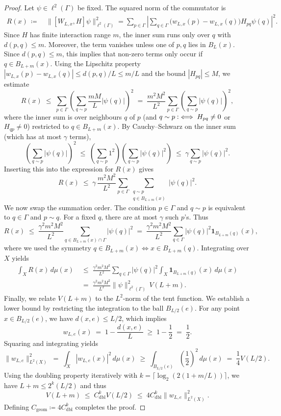 \documentclass[11pt]{article}
\theoremstyle{definition}
\begin{document}
\begin{proof}
Let $\psi \in \ell^2(\Gamma)$ be fixed. The squared norm of the commutator is
\begin{align*}
  R(x)
  \,\coloneqq &\ \bigl\|[W_{L,x}, H] \psi\bigr\|_{\ell^2(\Gamma)}^2
       =  \sum_{p \in \Gamma} \left| \sum_{q \in \Gamma}
        \bigl(w_{L,x}(p) - w_{L,x}(q)\bigr) H_{pq} \psi(q)\right|^2.
\end{align*}
Since $H$ has finite interaction range $m$, the inner sum runs only over $q$ with $d(p,q) \le m$. Moreover, the term vanishes unless one of $p,q$ lies in $B_L(x)$. Since $d(p,q)\le m$, this implies that non-zero terms only occur if $q \in B_{L+m}(x)$.
Using the Lipschitz property $|w_{L,x}(p)-w_{L,x}(q)| \le d(p,q)/L \le m/L$ and the bound $|H_{pq}|\le M$, we estimate
\[
  R(x) \;\le\; \sum_{p \in \Gamma} \left( \sum_{q \sim p} \frac{mM}{L} |\psi(q)| \right)^2 \;=\; \frac{m^2M^2}{L^2}\sum_{p \in \Gamma} \left( \sum_{q \sim p} |\psi(q)| \right)^2,
\]
where the inner sum is over neighbours $q$ of $p$ (and $q\sim p \vcentcolon\iff H_{pq}\ne 0$ or $H_{qp}\ne 0$) restricted to $q \in B_{L+m}(x)$.
By Cauchy--Schwarz on the inner sum (which has at most $\gamma$ terms),
\[
  \left( \sum_{q \sim p} |\psi(q)| \right)^2
  \;\le\;
  \left(\sum_{q \sim p} 1^2\right) \left(\sum_{q \sim p} |\psi(q)|^2\right)
  \;\le\;
  \gamma \sum_{q \sim p} |\psi(q)|^2.
\]
Inserting this into the expression for $R(x)$ gives
\[
  R(x)
  \;\le\; \gamma\, \frac{m^2 M^2}{L^2} \sum_{p \in \Gamma} \sum_{\substack{q \sim p \\ q \in B_{L+m}(x)}} |\psi(q)|^2.
\]
We now swap the summation order. The condition $p \in \Gamma$ and $q \sim p$ is equivalent to $q \in \Gamma$ and $p \sim q$. For a fixed $q$, there are at most $\gamma$ such $p$'s. Thus
\[
  R(x)
  \;\le\; \frac{\gamma^2 m^2 M^2}{L^2} \sum_{q \in B_{L+m}(x)\cap \Gamma} |\psi(q)|^2
  \;=\; \frac{\gamma^2 m^2 M^2}{L^2} \sum_{q \in \Gamma} |\psi(q)|^2 \mathbf{1}_{B_{L+m}(q)}(x),
\]
where we used the symmetry $q \in B_{L+m}(x) \iff x \in B_{L+m}(q)$.
Integrating over $X$ yields
\begin{align*}
  \int_X R(x)\,d\mu(x)
  &\;\le\; \frac{\gamma^2 m^2 M^2}{L^2} \sum_{q \in \Gamma} |\psi(q)|^2 \int_X \mathbf{1}_{B_{L+m}(q)}(x)\,d\mu(x) \\
  &\;=\; \frac{\gamma^2 m^2 M^2}{L^2} \|\psi\|_{\ell^2(\Gamma)}^2 \, V(L+m).
\end{align*}
Finally, we relate $V(L+m)$ to the $L^2$-norm of the tent function. We establish a lower bound by restricting the integration to the ball $B_{L/2}(e)$. For any point $x \in B_{L/2}(e)$, we have $d(x,e) \leq L/2$, which implies
\[
  w_{L,e}(x) \;=\; 1 - \frac{d(x,e)}{L} \;\geq \; 1 - \frac{1}{2} \;=\; \frac{1}{2}.
\]
Squaring and integrating yields
\[
  \|w_{L,e}\|_{L^2(X)}^2
  \;=\; \int_X |w_{L,e}(x)|^2\,d\mu(x)
  \;\ge\; \int_{B_{L/2}(e)} \left(\frac{1}{2}\right)^2\,d\mu(x)
  \;=\; \frac{1}{4} V(L/2).
\]
Using the doubling property iteratively with $k=\lceil\log_2(2(1+m/L))\rceil$, we have $L+m \le 2^k (L/2)$ and thus
\[
  V(L+m) \;\le\; C_{\mathrm{dbl}}^k V(L/2) \;\le\; 4 C_{\mathrm{dbl}}^k \|w_{L,e}\|_{L^2(X)}^2.
\]
Defining $C_{\mathrm{geom}} \coloneqq 4 C_{\mathrm{dbl}}^k$ completes the proof.
\end{proof}
\end{document}
